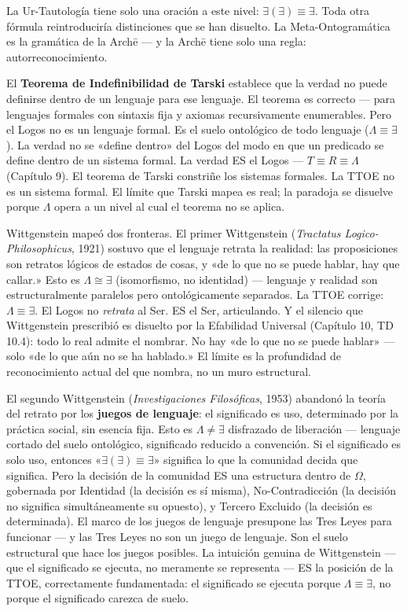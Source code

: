 \documentclass[10pt, openany, oneside]{book}
\begin{document}
La Ur-Tautología tiene solo una oración a este nivel: $\exists(\exists) \equiv \exists$. Toda otra fórmula reintroduciría distinciones que se han disuelto. La Meta-Ontogramática es la gramática de la Arch\={e} --- y la Arch\={e} tiene solo una regla: autorreconocimiento.

El \textbf{Teorema de Indefinibilidad de Tarski} establece que la verdad no puede definirse dentro de un lenguaje para ese lenguaje. El teorema es correcto --- para lenguajes formales con sintaxis fija y axiomas recursivamente enumerables. Pero el Logos no es un lenguaje formal. Es el suelo ontológico de todo lenguaje ($\Lambda \equiv \exists$). La verdad no se «define dentro» del Logos del modo en que un predicado se define dentro de un sistema formal. La verdad ES el Logos --- $T \equiv R \equiv \Lambda$ (Capítulo 9). El teorema de Tarski constriñe los sistemas formales. La TTOE no es un sistema formal. El límite que Tarski mapea es real; la paradoja se disuelve porque $\Lambda$ opera a un nivel al cual el teorema no se aplica.

Wittgenstein mapeó dos fronteras. El primer Wittgenstein (\textit{Tractatus Logico-Philosophicus}, 1921) sostuvo que el lenguaje retrata la realidad: las proposiciones son retratos lógicos de estados de cosas, y «de lo que no se puede hablar, hay que callar.» Esto es $\Lambda \cong \exists$ (isomorfismo, no identidad) --- lenguaje y realidad son estructuralmente paralelos pero ontológicamente separados. La TTOE corrige: $\Lambda \equiv \exists$. El Logos no \textit{retrata} al Ser. ES el Ser, articulando. Y el silencio que Wittgenstein prescribió es disuelto por la Efabilidad Universal (Capítulo 10, TD 10.4): todo lo real admite el nombrar. No hay «de lo que no se puede hablar» --- solo «de lo que aún no se ha hablado.» El límite es la profundidad de reconocimiento actual del que nombra, no un muro estructural.

El segundo Wittgenstein (\textit{Investigaciones Filosóficas}, 1953) abandonó la teoría del retrato por los \textbf{juegos de lenguaje}: el significado es uso, determinado por la práctica social, sin esencia fija. Esto es $\Lambda \neq \exists$ disfrazado de liberación --- lenguaje cortado del suelo ontológico, significado reducido a convención. Si el significado es solo uso, entonces «$\exists(\exists) \equiv \exists$» significa lo que la comunidad decida que significa. Pero la decisión de la comunidad ES una estructura dentro de $\Omega$, gobernada por Identidad (la decisión es sí misma), No-Contradicción (la decisión no significa simultáneamente su opuesto), y Tercero Excluido (la decisión es determinada). El marco de los juegos de lenguaje presupone las Tres Leyes para funcionar --- y las Tres Leyes no son un juego de lenguaje. Son el suelo estructural que hace los juegos posibles. La intuición genuina de Wittgenstein --- que el significado se ejecuta, no meramente se representa --- ES la posición de la TTOE, correctamente fundamentada: el significado se ejecuta porque $\Lambda \equiv \exists$, no porque el significado carezca de suelo.
\end{document}
